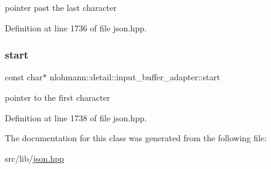 pointer past the last character 



Definition at line 1736 of file json.\+hpp.

\mbox{\label{classnlohmann_1_1detail_1_1input__buffer__adapter_a028e9bb232143d8a2b6b204fa28c3493}} 
\subsubsection{\texorpdfstring{start}{start}}
{\footnotesize\ttfamily const char$\ast$ nlohmann\+::detail\+::input\+\_\+buffer\+\_\+adapter\+::start\hspace{0.3cm}{\ttfamily [private]}}



pointer to the first character 



Definition at line 1738 of file json.\+hpp.



The documentation for this class was generated from the following file\+:\begin{DoxyCompactItemize}
\item 
src/lib/\hyperlink{json_8hpp}{json.\+hpp}\end{DoxyCompactItemize}
